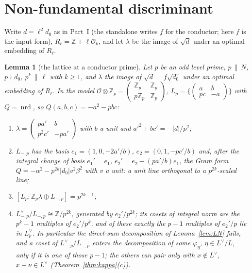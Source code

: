 \documentclass[11pt,reqno]{amsart}
\theoremstyle{plain}
\newtheorem{lemma}[theorem]{Lemma}
\theoremstyle{definition}
\DeclareMathOperator{\nrd}{nrd}
\newcommand{\Z}{\mathbb{Z}}
\newcommand{\Ldual}{L^{\vee}}
\begin{document}
\section{Non-fundamental discriminant}
Write $d=\ell^2d_0$ as in Part~I (the standalone writes $f$ for the conductor; here $f$ is the input form), $R_\ell=\Z+\ell\mathcal O_k$, and let $\lambda$ be the image of $\sqrt d$ under an optimal embedding of $R_\ell$.

\begin{lemma}[the lattice at a conductor prime]\label{lem:conductor}
Let $p$ be an odd level prime, $p\,\|\,N$, $p\nmid d_0$, $p^k\,\|\,\ell$ with $k\ge1$, and
$\lambda$ the image of $\sqrt d=f\sqrt{d_0}$ under an optimal embedding of $R_\ell$. In the model
$\mathcal O\otimes\Z_p=\begin{pmatrix}\Z_p&\Z_p\\p\Z_p&\Z_p\end{pmatrix}$, $L_p=\{\begin{pmatrix}
a&b\\pc&-a\end{pmatrix}\}$ with $Q=\nrd$, so $Q(a,b,c)=-a^2-pbc$:
\begin{enumerate}
\item $\lambda=\begin{pmatrix}pa'&b\\p^2c'&-pa'\end{pmatrix}$ with $b$ a unit and
$a'^2+bc'=-\lvert d\rvert/p^2$;
\item $L_{-,p}$ has the basis $e_1=(1,0,-2a'/b)$, $e_2=(0,1,-pc'/b)$ and, after the integral change
of basis $e_1'=e_1$, $e_2'=e_2-(pa'/b)e_1$, the Gram form
$Q=-\alpha^2-p^{2k}\lvert d_0\rvert v^2\beta^2$ with $v$ a unit: a unit line orthogonal to a
$p^{2k}$-scaled line;
\item $[L_p:\Z_p\lambda\oplus L_{-,p}]=p^{2k-1}$;
\item $L_{-,p}^\vee/L_{-,p}\cong\Z/p^{2k}$, generated by $e_2'/p^{2k}$; its cosets of integral norm are
the $p^k-1$ multiples of $e_2'/p^k$, and of these exactly the $p-1$ multiples of $e_2'/p$ lie in
$L_p^\vee$. In particular the direct-sum decomposition of Lemma~\ref{lem:LN} fails, and a coset of
$L_{-,p}^\vee/L_{-,p}$ enters the decomposition of some $\varphi_\eta$, $\eta\in\Ldual/L$, only if it
is one of those $p-1$; the others can pair only with $x\notin\Ldual$, $x+\nu\in\Ldual$
(Theorem~\ref{thm:kappa}(c)).
\end{enumerate}
\end{lemma}
\end{document}
